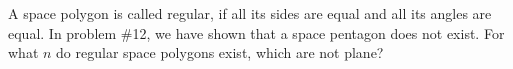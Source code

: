 A space polygon is called regular, if all its sides are equal and all its angles are equal. In problem \#12, we have shown that a space pentagon does not exist. For what $n$ do regular space polygons exist, which are not plane?
